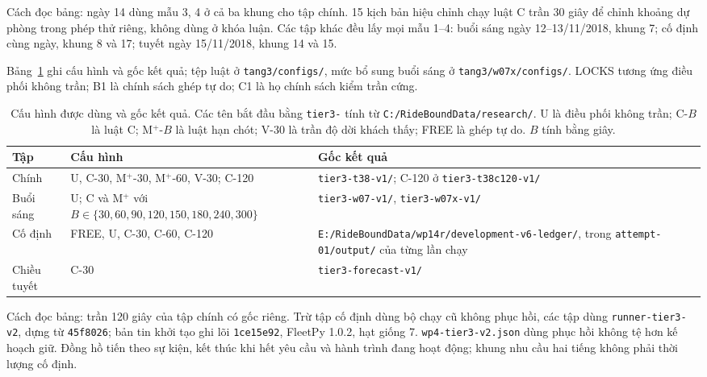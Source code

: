 Cách đọc bảng: ngày 14 dùng mẫu 3, 4 ở cả ba khung cho tập chính. 15 kịch bản hiệu chỉnh chạy luật C trần 30 giây để chỉnh khoảng dự phòng trong phép thử riêng, không dùng ở khóa luận. Các tập khác đều lấy mọi mẫu 1--4: buổi sáng ngày 12--13/11/2018, khung 7; cố định cùng ngày, khung 8 và 17; tuyết ngày 15/11/2018, khung 14 và 15.

Bảng~\ref{bang:pl-goc} ghi cấu hình và gốc kết quả; tệp luật ở \nolinkurl{tang3/configs/}, mức bổ sung buổi sáng ở \nolinkurl{tang3/w07x/configs/}. LOCKS tương ứng điều phối không trần; B1 là chính sách ghép tự do; C1 là họ chính sách kiểm trần cứng.

\begin{table}[htbp]
\centering
\caption{Cấu hình được dùng và gốc kết quả. Các tên bắt đầu bằng \texttt{tier3-} tính từ \nolinkurl{C:/RideBoundData/research/}. U là điều phối không trần; C-$B$ là luật C; M$^+$-$B$ là luật hạn chót; V-30 là trần độ dời khách thấy; FREE là ghép tự do. $B$ tính bằng giây.}
\label{bang:pl-goc}
\begin{tabular}{@{}p{2.8cm}p{5.4cm}p{6.8cm}@{}}
\toprule
\textbf{Tập} & \textbf{Cấu hình} & \textbf{Gốc kết quả} \\
\midrule
Chính & U, C-30, M$^+$-30, M$^+$-60, V-30; C-120 & \nolinkurl{tier3-t38-v1/}; C-120 ở \nolinkurl{tier3-t38c120-v1/} \\
Buổi sáng & U; C và M$^+$ với $B\in\{30,60,90,120,150,180,240,300\}$ & \nolinkurl{tier3-w07-v1/}, \nolinkurl{tier3-w07x-v1/} \\
Cố định & FREE, U, C-30, C-60, C-120 & \nolinkurl{E:/RideBoundData/wp14r/development-v6-ledger/}, trong \nolinkurl{attempt-01/output/} của từng lần chạy \\
Chiều tuyết & C-30 & \nolinkurl{tier3-forecast-v1/} \\
\bottomrule
\end{tabular}
\end{table}

Cách đọc bảng: trần 120 giây của tập chính có gốc riêng. Trừ tập cố định dùng bộ chạy cũ không phục hồi, các tập dùng \nolinkurl{runner-tier3-v2}, dựng từ \texttt{45f8026}; bản tin khởi tạo ghi lõi \texttt{1ce15e92}, FleetPy 1.0.2, hạt giống 7. \nolinkurl{wp4-tier3-v2.json} dùng phục hồi không tệ hơn kế hoạch giữ. Đồng hồ tiến theo sự kiện, kết thúc khi hết yêu cầu và hành trình đang hoạt động; khung nhu cầu hai tiếng không phải thời lượng cố định.

